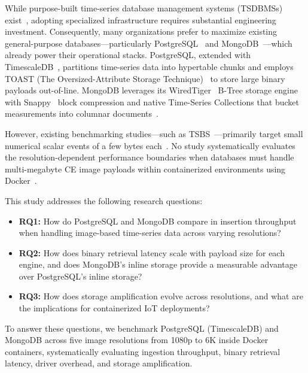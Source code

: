 \documentclass[conference, a4paper]{IEEEtran}
\begin{document}
While purpose-built time-series database management systems (TSDBMSs) exist~\cite{dewaal_timeseries_survey,tigerdata_tsdb_compare}, adopting specialized infrastructure requires substantial engineering investment. Consequently, many organizations prefer to maximize existing general-purpose databases---particularly PostgreSQL~\cite{postgresql_official} and MongoDB~\cite{mongodb_official}---which already power their operational stacks. PostgreSQL, extended with TimescaleDB~\cite{timescaledb_official}, partitions time-series data into hypertable chunks and employs TOAST (The Oversized-Attribute Storage Technique)~\cite{postgresql_toast_docs} to store large binary payloads out-of-line. MongoDB leverages its WiredTiger~\cite{mongodb_wiredtiger_storage} B-Tree storage engine with Snappy~\cite{google_snappy} block compression and native Time-Series Collections that bucket measurements into columnar documents~\cite{influxdata_mongodb_timescaledb,tigerdata_mongodb_timescaledb}.

However, existing benchmarking studies---such as TSBS~\cite{tsbs}---primarily target small numerical scalar events of a few bytes each~\cite{tsbs,cratedb_ts_benchmark,diva_timescaledb_mongodb_eval}. No study systematically evaluates the resolution-dependent performance boundaries when databases must handle multi-megabyte CE image payloads within containerized environments using Docker~\cite{docker_official}.

This study addresses the following research questions:
\begin{itemize}
    \item \textbf{RQ1:} How do PostgreSQL and MongoDB compare in insertion throughput when handling image-based time-series data across varying resolutions?
    \item \textbf{RQ2:} How does binary retrieval latency scale with payload size for each engine, and does MongoDB's inline storage provide a measurable advantage over PostgreSQL's inline storage?
    \item \textbf{RQ3:} How does storage amplification evolve across resolutions, and what are the implications for containerized IoT deployments?
\end{itemize}

To answer these questions, we benchmark PostgreSQL (TimescaleDB) and MongoDB across five image resolutions from 1080p to 6K inside Docker containers, systematically evaluating ingestion throughput, binary retrieval latency, driver overhead, and storage amplification.
\end{document}
